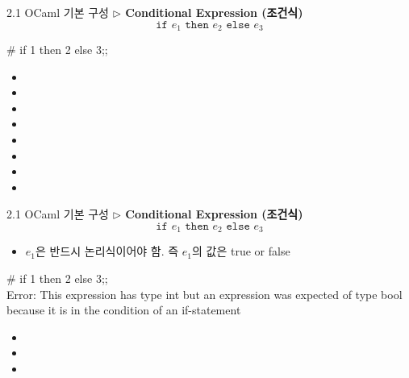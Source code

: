 \documentclass[10pt]{beamer}
\begin{document}
	\begin{frame}{2.1 OCaml 기본 구성}
		\textbf{$\triangleright$ Conditional Expression (조건식)}	
		\[
		\texttt{if $e_1$ then $e_2$ else $e_3$}
		\]
		\begin{tcolorbox}[colback=backcolor]\ttfamily
		\# if 1 then 2 else 3;;
		\end{tcolorbox}
		\begin{itemize}
			\item[] 
			\item[] 
			\item[] 
			\item[] 
			\item[] 
			\item[] 
			\item[] 
			\item[] 
		\end{itemize}
	\end{frame}
	\begin{frame}{2.1 OCaml 기본 구성}
		\textbf{$\triangleright$ Conditional Expression (조건식)}	
		\[
		\texttt{if $e_1$ then $e_2$ else $e_3$}
		\]
		\begin{itemize}
			\item $e_1$은 반드시 논리식이어야 함. 즉 $e_1$의 값은 true or false
		\end{itemize}
		\begin{tcolorbox}[colback=backcolor]\ttfamily
			\# if 1 then 2 else 3;;\\
			Error: This expression has type int but an expression was expected of type
			bool
			because it is in the condition of an if-statement
		\end{tcolorbox}
		\begin{itemize}
			\item[] 
			\item[] 
			\item[] 
		\end{itemize}
	\end{frame}
	
\end{document}
